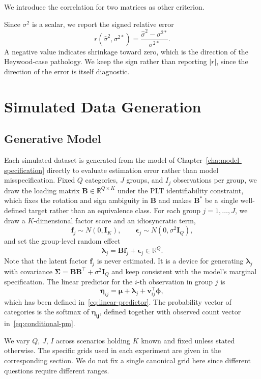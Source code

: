 We introduce the correlation for two matrices as other criterion. 

Since $\sigma^2$ is a scalar, we report the signed relative error
\[
r(\hat\sigma^2, \sigma^{2\ast}) = \frac{\hat\sigma^2 - \sigma^{2\ast}}{\sigma^{2\ast}}.
\]
A negative value indicates shrinkage toward zero, which is the direction of the Heywood-case pathology. We keep the sign rather than reporting $|r|$, since the direction of the error is itself diagnostic.

\section{Simulated Data Generation}
\label{sec:sim-data}

\subsection{Generative Model}

Each simulated dataset is generated from the model of Chapter~\ref{cha:model-specification} directly to evaluate estimation error rather than model misspecification. Fixed $Q$ categories, $J$ groups, and $I_{j}$ observations per group, we draw the loading matrix $\mathbf{B} \in \mathbb{R}^{Q \times K}$ under the PLT identifiability constraint, which fixes the rotation and sign ambiguity in $\mathbf{B}$ and makes $\mathbf{B}^{*}$ be a single well-defined target rather than an equivalence class. For each group $j = 1, \dots, J$, we draw a $K$-dimensional factor score and an idiosyncratic term,
\[
\mathbf{f}_j \sim N(0, \mathbf{I}_K), \qquad \bm{\epsilon}_j \sim N(0, \sigma^2 \mathbf{I}_Q),
\]
and set the group-level random effect
\[
\bm{\lambda}_j = \mathbf{Bf}_j + \bm{\epsilon}_j \in \mathbb{R}^Q.
\]
Note that the latent factor $\mathbf{f}_j$ is never estimated. It is a device for generating $\bm{\lambda}_j$ with covariance $\bm{\Sigma} = \mathbf{BB}^\top + \sigma^2 \mathbf{I}_Q$ and keep consistent with the model's marginal specification. The linear predictor for the $i$-th observation in group $j$ is
\[
\bm{\eta}_{ij} = \bm{\mu} + \bm{\lambda}_j + \bm{v}_{ij}^\top \bm{\phi},
\]
which has been defined in~\ref{eq:linear-predictor}. The probability vector of categories is the softmax of $\bm{\eta_{ij}}$, defined together with observed count vector in~\ref{eq:conditional-pm}.

We vary $Q$, $J$, $I$ across scenarios holding $K$ known and fixed unless stated otherwise. The specific grids used in each experiment are given in the corresponding section. We do not fix a single canonical grid here since different questions require different ranges. 

